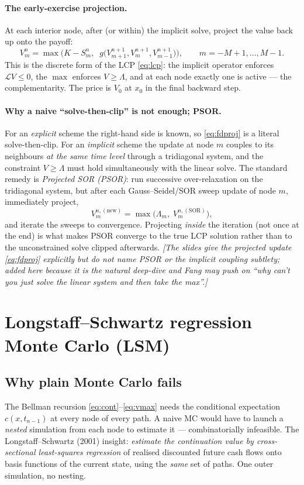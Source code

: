 \documentclass[11pt]{article}
\begin{document}
\paragraph{The early-exercise projection.} At each interior node, after (or within) the implicit solve, project
the value back up onto the payoff:
\begin{equation}\label{eq:fdproj}
V_m^n=\max\!\Big(K-S_m^n,\;\; g\big(V_{m+1}^{n+1},V_m^{n+1},V_{m-1}^{n+1}\big)\Big),
\qquad m=-M+1,\dots,M-1.
\end{equation}
This is the discrete form of the LCP \eqref{eq:lcp}: the implicit operator enforces $\mathcal L V\le0$, the
$\max$ enforces $V\ge\Lambda$, and at each node exactly one is active --- the complementarity. The price is
$V_0$ at $x_0$ in the final backward step.

\paragraph{Why a naive ``solve-then-clip'' is not enough; PSOR.} For an \emph{explicit} scheme the right-hand
side is known, so \eqref{eq:fdproj} is a literal solve-then-clip. For an \emph{implicit} scheme the update at
node $m$ couples to its neighbours \emph{at the same time level} through a tridiagonal system, and the
constraint $V\ge\Lambda$ must hold simultaneously with the linear solve. The standard remedy is \emph{Projected
SOR (PSOR)}: run successive over-relaxation on the tridiagonal system, but after each Gauss--Seidel/SOR sweep
update of node $m$, immediately project,
\begin{equation}\label{eq:psor}
V_m^{n,(\text{new})}=\max\!\Big(\Lambda_m,\; V_m^{n,(\text{SOR})}\Big),
\end{equation}
and iterate the sweeps to convergence. Projecting \emph{inside} the iteration (not once at the end) is what
makes PSOR converge to the true LCP solution rather than to the unconstrained solve clipped afterwards.
\emph{[The slides give the projected update \eqref{eq:fdproj} explicitly but do not name PSOR or the implicit
coupling subtlety; added here because it is the natural deep-dive and Fang may push on ``why can't you just
solve the linear system and then take the max''.]}

\section{Longstaff--Schwartz regression Monte Carlo (LSM)}\label{sec:lsm}

\subsection{Why plain Monte Carlo fails}
The Bellman recursion \eqref{eq:cont}--\eqref{eq:vmax} needs the conditional expectation $c(x,t_{n-1})$ at
every node of every path. A naive MC would have to launch a \emph{nested} simulation from each node to estimate
it --- combinatorially infeasible. The Longstaff--Schwartz (2001) insight: \emph{estimate the continuation
value by cross-sectional least-squares regression} of realised discounted future cash flows onto basis
functions of the current state, using the \emph{same} set of paths. One outer simulation, no nesting.
\end{document}
